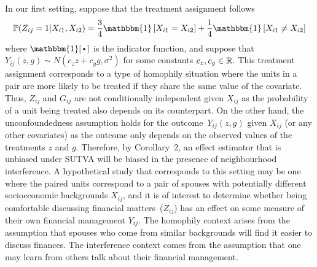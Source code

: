 \documentclass[10pt]{article}
\begin{document}
In our first setting, suppose that the treatment assignment follows
\[
\P(Z_{ij}=1|X_{i1},X_{i2}) = \frac{3}{4}\mathbbm{1}\left[X_{i1}=X_{i2}\right] + \frac{1}{4}\mathbbm{1}\left[X_{i1}\neq X_{i2}\right]
\]
where $\mathbbm{1}[\argdot]$ is the indicator function, and suppose that $Y_{ij}(z,g)\sim N(c_zz+c_gg,\sigma^2)$ for some constants $c_z,c_g\in\mathbb{R}$. This treatment assignment corresponds to a type of homophily situation where the units in a pair are more likely to be treated if they share the same value of the covariate. Thus, $Z_{ij}$ and $G_{ij}$ are not conditionally independent given $X_{ij}$ as the probability of a unit being treated also depends on its counterpart. On the other hand, the unconfoundedness assumption holds for the outcome~$Y_{ij}(z,g)$ given $X_{ij}$ (or any other covariates) as the outcome only depends on the observed values of the treatments $z$ and $g$. Therefore, by Corollary~2, an effect estimator that is unbiased under SUTVA will be biased in the presence of neighbourhood interference. A hypothetical study that corresponds to this setting may be one where the paired units correspond to a pair of spouses with potentially different socioeconomic backgrounds $X_{ij}$, and it is of interest to determine whether being comfortable discussing financial matters~($Z_{ij}$) has an effect on some measure of their own financial management $Y_{ij}$. The homophily context arises from the assumption that spouses who come from similar backgrounds will find it easier to discuss finances. The interference context comes from the assumption that one may learn from others talk about their financial management.
\\

\end{document}
